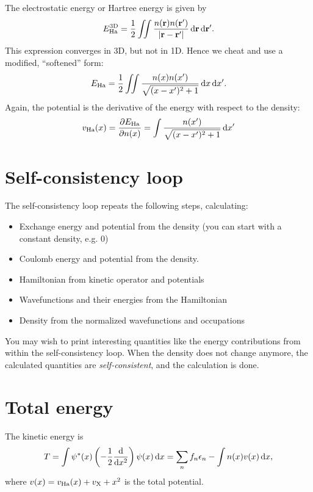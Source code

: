 \documentclass{article}
\begin{document}
The electrostatic energy or Hartree energy is given by
\begin{align}
  E_{\mathrm{Ha}}^{\mathrm{3D}} = \frac12 \iint \frac{n(\mathbf r)n(\mathbf r')}{|\mathbf r - \mathbf r'|}\,\mathrm d \mathbf r \,\mathrm d \mathbf r'.
\end{align}
This expression converges in 3D, but not in 1D.  Hence we cheat and use
a modified, ``softened'' form:
\begin{align}
E_{\mathrm{Ha}} = \frac12 \iint \frac{n(x) n(x')}{\sqrt{(x - x')^2 + 1}}
\,\mathrm d x \,\mathrm d x'.
\end{align}
Again, the potential is the derivative of the energy with respect to the
density:
\begin{align}
  v_{\mathrm{Ha}}(x) = \frac{\partial E_{\mathrm{Ha}}}{\partial n(x)} =
  \int \frac{n(x')}{\sqrt{(x - x')^2 + 1}} \,\mathrm d x'
\end{align}


\section*{Self-consistency loop}
The self-consistency loop repeats the following steps, calculating:
\begin{itemize}
\item Exchange energy and potential from the density (you can start with a
  constant density, e.g. 0)
\item Coulomb energy and potential from the density.
\item Hamiltonian from kinetic operator and potentials
\item Wavefunctions and their energies from the Hamiltonian
\item Density from the normalized wavefunctions and occupations
\end{itemize}



\noindent You may wish to print interesting quantities like the energy
contributions from within the self-consistency loop.
When the
density does not change anymore, the calculated quantities are
\emph{self-consistent}, and the calculation is done.

\section*{Total energy}
The kinetic energy is
\begin{align}
  T = \int \psi^*(x)\left(-\frac12 \frac{\mathrm d }{\mathrm d x^2}\right) \psi(x) \,\mathrm d x
  = \sum_n f_n \epsilon_n - \int n(x) v(x) \,\mathrm d x,
\end{align}
where $v(x) = v_{\mathrm{Ha}}(x) + v_{\mathrm{X}} + x^2$ is the total potential.
\end{document}
